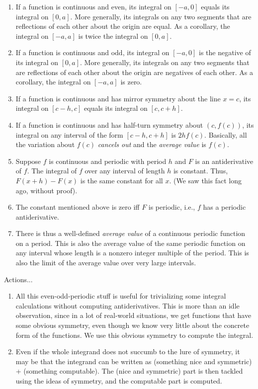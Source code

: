 \documentclass{amsart}
\begin{document}
\begin{enumerate}
\item If a function is continuous and even, its integral on $[-a,0]$
  equals its integral on $[0,a]$. More generally, its integrals on any
  two segments that are reflections of each other about the origin are
  equal. As a corollary, the integral on $[-a,a]$ is twice the
  integral on $[0,a]$.
\item If a function is continuous and odd, its integral on $[-a,0]$ is
  the negative of its integral on $[0,a]$. More generally, its
  integrals on any two segments that are reflections of each other
  about the origin are negatives of each other. As a corollary, the
  integral on $[-a,a]$ is zero.
\item If a function is continuous and has mirror symmetry about the
  line $x = c$, its integral on $[c-h,c]$ equals its integral on
  $[c,c+h]$.
\item If a function is continuous and has half-turn symmetry about
  $(c,f(c))$, its integral on any interval of the form $[c-h,c+h]$ is
  $2hf(c)$. Basically, all the variation about $f(c)$ {\em cancels
  out} and the {\em average value} is $f(c)$.
\item Suppose $f$ is continuous and periodic with period $h$ and $F$
  is an antiderivative of $f$. The integral of $f$ over any interval
  of length $h$ is constant. Thus, $F(x + h) - F(x)$ is the same
  constant for all $x$. (We saw this fact long ago, without proof).
\item The constant mentioned above is zero iff $F$ is periodic, i.e.,
  $f$ has a periodic antiderivative.
\item There is thus a well-defined {\em average value} of a continuous
  periodic function on a period. This is also the average value of the
  same periodic function on any interval whose length is a nonzero
  integer multiple of the period. This is also the limit of the
  average value over very large intervals.
\end{enumerate}

Actions...

\begin{enumerate}
\item All this even-odd-periodic stuff is useful for trivializing some
  integral calculations without computing antiderivatives. This is
  more than an idle observation, since in a lot of real-world
  situations, we get functions that have some obvious symmetry, even
  though we know very little about the concrete form of the
  functions. We use this obvious symmetry to compute the integral.
\item Even if the whole integrand does not succumb to the lure of
  symmetry, it may be that the integrand can be written as (something
  nice and symmetric) + (something computable). The (nice and
  symmetric) part is then tackled using the ideas of symmetry, and the
  computable part is computed.
\end{enumerate}
\end{document}
